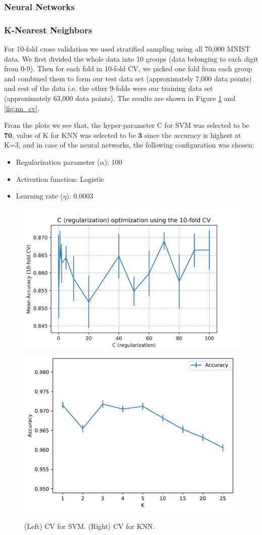 \documentclass[10pt]{scrartcl}
\begin{document}
\subsubsection*{Neural Networks}

\subsubsection*{K-Nearest Neighbors}
For 10-fold cross validation we used stratified sampling using all 70,000 MNIST data. We first divided the whole data into 10 groups (data belonging to each digit from 0-9). Then  for each fold in 10-fold CV, we picked one fold from each group and combined them to form our test data set (approximately 7,000 data points) and rest of the data i.e. the other 9-folds were our training data set (approximately 63,000 data points). The results are shown in Figure \ref{fig:svm_knn_cv} and \ref{fig:nn_cv}.

From the plots we see that, the hyper-parameter C for SVM was selected to be $\mathbf{70}$, value of K for KNN was selected to be $\mathbf{3}$ since the accuracy is highest at K=3, and in case of the neural networks, the following configuration was chosen: 

\begin{itemize}
\item Regularization parameter ($\alpha$): $100$
\item Activation function: Logistic
\item Learning rate ($\eta$): 0.0003
\end{itemize}

\begin{figure}[H]
\centering
\includegraphics[width=0.45\linewidth]{figures/SVM_regularization_C_mean_acc_error_bar.png}
\includegraphics[width=0.4\linewidth]{figures/KNN_accuracy_vs_k_with_all_k_values.pdf}
\caption{(Left) CV for SVM. (Right) CV for KNN. \label{fig:svm_knn_cv}}
\end{figure}
\end{document}
